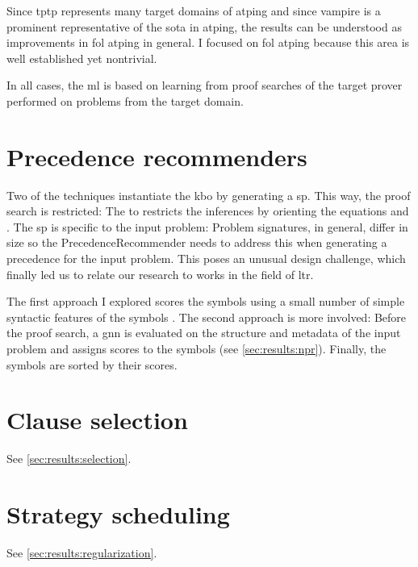 Since \gls{tptp} represents many target domains of \gls{atping} and since \gls{vampire} is a prominent representative of the \acrlong{sota} in \gls{atping},
the results can be understood as improvements in \gls{fol} \gls{atping} in general.
I focused on \gls{fol} \gls{atping} because this area is well established yet nontrivial.

In all cases, the \gls{ml} is based on learning from proof searches of the target prover performed on problems from the target domain.

\section{Precedence recommenders}

Two of the techniques instantiate the \gls{kbo} by generating a \gls{sp}.
This way, the proof search is restricted: The \gls{to} restricts the inferences by orienting the equations and .
The \gls{sp} is specific to the input problem:
Problem \glspl{signature}, in general, differ in size so the \gls{PrecedenceRecommender} needs to address this when generating a \gls{precedence} for the input problem.
This poses an unusual design challenge, which finally led us to relate our research to works in the field of \gls{ltr}.

The first approach I explored scores the \glspl{symbol} using a small number of simple syntactic features of the \glspl{symbol} \cite{}.
The second approach is more involved:
Before the proof search, a \gls{gnn} is evaluated on the structure and metadata of the input \gls{problem} and assigns scores to the \glspl{symbol} (see \cref{sec:results:npr}).
Finally, the symbols are sorted by their scores.

\section{Clause selection}

See \cref{sec:results:selection}.

\section{Strategy scheduling}

See \cref{sec:results:regularization}.
